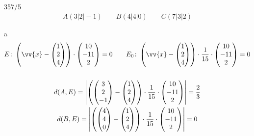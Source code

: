 \begin{exercise}{357/5}
  \begin{gather*}
    A(3|2|-1) \qquad B(4|4|0) \qquad C(7|3|2)
  \end{gather*}
  \item [a]
  \begin{gather*}
    E \colon \left(\vv{x} - \begin{pmatrix}1 \\ 2 \\ 4\end{pmatrix}\right) \cdot \begin{pmatrix}10 \\ -11 \\ 2\end{pmatrix} = 0 \qquad E_0 \colon \left(\vv{x} - \begin{pmatrix}1 \\ 2 \\ 4\end{pmatrix}\right) \cdot \frac{1}{15} \cdot \begin{pmatrix}10 \\ -11 \\ 2\end{pmatrix} = 0 \\\\
    d(A, E) = \left|\left(\begin{pmatrix}3 \\ 2 \\ -1\end{pmatrix} - \begin{pmatrix}1 \\ 2 \\ 4\end{pmatrix}\right) \cdot \frac{1}{15} \cdot \begin{pmatrix}10 \\ -11 \\ 2\end{pmatrix}\right| = \frac{2}{3} \\
    d(B, E) = \left|\left(\begin{pmatrix}4 \\ 4 \\ 0\end{pmatrix} - \begin{pmatrix}1 \\ 2 \\ 4\end{pmatrix}\right) \cdot \frac{1}{15} \cdot \begin{pmatrix}10 \\ -11 \\ 2\end{pmatrix}\right| = 0 \\

\end{gather*}
\end{exercise}
